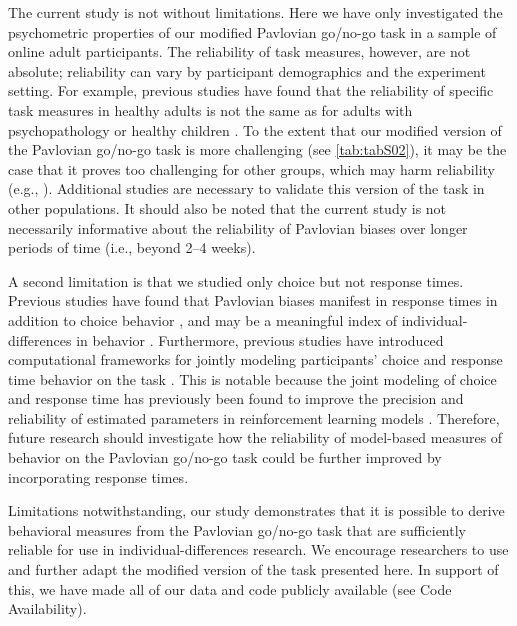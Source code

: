 \documentclass[a4paper,12pt]{article}
\begin{document}
\begin{refsection}[main]
The current study is not without limitations. Here we have only investigated the psychometric properties of our modified Pavlovian go/no-go task in a sample of online adult participants. The reliability of task measures, however, are not absolute; reliability can vary by participant demographics and the experiment setting. For example, previous studies have found that the reliability of specific task measures in healthy adults is not the same as for adults with psychopathology \cite{cooper2017role} or healthy children \cite{arnon2020current}. To the extent that our modified version of the Pavlovian go/no-go task is more challenging (see \ref{tab:tabS02}), it may be the case that it proves too challenging for other groups, which may harm reliability (e.g., \cite{arnon2020current}). Additional studies are necessary to validate this version of the task in other populations. It should also be noted that the current study is not necessarily informative about the reliability of Pavlovian biases over longer periods of time (i.e., beyond 2--4 weeks).

A second limitation is that we studied only choice but not response times. Previous studies have found that Pavlovian biases manifest in response times in addition to choice behavior \cite{millner2018pavlovian, algermissen2022striatal}, and may be a meaningful index of individual-differences in behavior \cite{betts2020learning, millner2019suicidal, scholz2020dissociable}. Furthermore, previous studies have introduced computational frameworks for jointly modeling participants' choice and response time behavior on the task \cite{millner2018pavlovian, millner2019suicidal}. This is notable because the joint modeling of choice and response time has previously been found to improve the precision and reliability of estimated parameters in reinforcement learning models \cite{ballard2019joint, shahar2019improving}. Therefore, future research should investigate how the reliability of model-based measures of behavior on the Pavlovian go/no-go task could be further improved by incorporating response times. 

Limitations notwithstanding, our study demonstrates that it is possible to derive behavioral measures from the Pavlovian go/no-go task that are sufficiently reliable for use in individual-differences research. We encourage researchers to use and further adapt the modified version of the task presented here. In support of this, we have made all of our data and code publicly available (see Code Availability).


\end{refsection}
\end{document}
